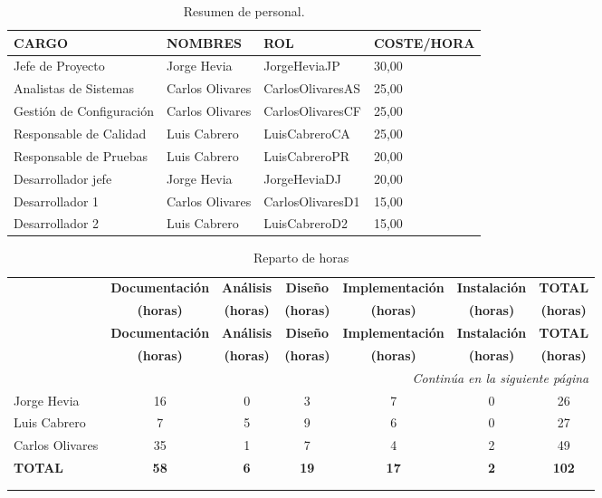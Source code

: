 \begin{table}[H]
\begin{center}
\begin{tabular}{l l l l}

\textbf{CARGO} & \textbf{NOMBRES} & \textbf{ROL} & \textbf{COSTE/HORA}\\ \hline \hline
Jefe de Proyecto & Jorge Hevia & JorgeHeviaJP & 30,00  \\
Analistas de Sistemas & Carlos Olivares & CarlosOlivaresAS & 25,00\\
Gestión de Configuración & Carlos Olivares & CarlosOlivaresCF & 25,00\\
Responsable de Calidad & Luis Cabrero & LuisCabreroCA & 25,00\\
Responsable de Pruebas & Luis Cabrero & LuisCabreroPR & 20,00\\
Desarrollador jefe & Jorge Hevia & JorgeHeviaDJ & 20,00\\
Desarrollador 1 & Carlos Olivares & CarlosOlivaresD1 & 15,00\\
Desarrollador 2 & Luis Cabrero & LuisCabreroD2 & 15,00\\ \hline \hline
\end{tabular}
\caption{Resumen de personal.}
\label{tab:personal}
\end{center}
\end{table}



\begin{center}
\begin{longtable}{lcccccc}

& \textbf{Documentación}	&	\textbf{Análisis}	&	\textbf{Diseño}	&	\textbf{Implementación}	&	\textbf{Instalación}	&	\textbf{TOTAL} \\
& \textbf{(horas)}	&	\textbf{(horas)}	&	\textbf{(horas)}	&	\textbf{(horas)}	&	\textbf{(horas)}	&	\textbf{(horas)} \\
\hline
\hline
\endfirsthead
& \textbf{Documentación}	&	\textbf{Análisis}	&	\textbf{Diseño}	&	\textbf{Implementación}	&	\textbf{Instalación}	&	\textbf{TOTAL} \\
& \textbf{(horas)}	&	\textbf{(horas)}	&	\textbf{(horas)}	&	\textbf{(horas)}	&	\textbf{(horas)}	&	\textbf{(horas)} \\
\hline
\hline
\endhead

\hline \multicolumn{7}{r}{\textit{Continúa en la siguiente página}} \\
\endfoot
\endlastfoot

Jorge Hevia	&	16	&	0	&	3	&	7	&	0	&	26	\\
Luis Cabrero &	7	&	5	&	9	&	6	&	0	&	27	\\
Carlos Olivares &	35	&	1	&	7	&	4	&	2	&	49	\\	\hline \hline
\textbf{TOTAL}	&	\textbf{58}	&	\textbf{6}	&	\textbf{19}	&	\textbf{17}	&\textbf{2}	&	\textbf{102}	\\	\hline

\caption{Reparto de horas}\\
\label{tab:repHoras}
\end{longtable}
\end{center}




